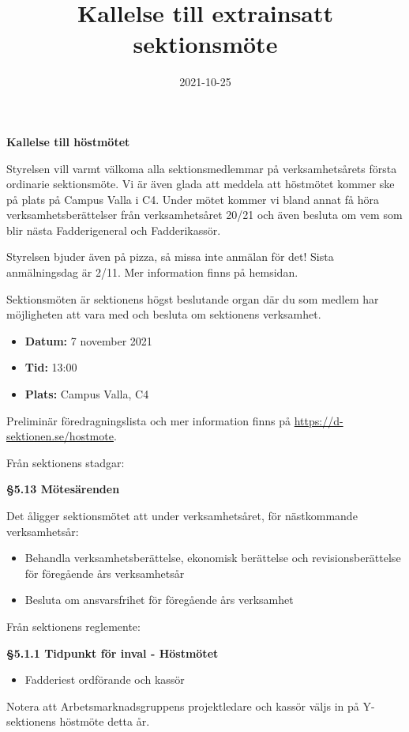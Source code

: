 \documentclass{datateknologsektionen-document}
\title{Kallelse till extrainsatt sektionsmöte}
\date{2021-10-25}
\begin{document}





\large
\begin{center}
  \vspace*{5mm}
  {\LARGE\bfseries Kallelse till höstmötet}
  \vspace{2mm}
\end{center}

Styrelsen vill varmt välkoma alla sektionsmedlemmar på verksamhetsårets första ordinarie sektionsmöte. Vi är även glada att meddela att höstmötet kommer ske på plats på Campus Valla i C4. Under mötet kommer vi bland annat få höra verksamhetsberättelser från verksamhetsåret 20/21 och även besluta om vem som blir nästa Fadderigeneral och Fadderikassör. 

Styrelsen bjuder även på pizza, så missa inte anmälan för det! Sista anmälningsdag är 2/11. Mer information finns på hemsidan.

Sektionsmöten är sektionens högst beslutande organ där du som medlem har möjligheten att vara med och besluta om sektionens verksamhet. 

\vspace*{4mm}
\begin{itemize}
  \item \textbf{Datum:} 7 november 2021
  \item \textbf{Tid:} 13:00
  \item \textbf{Plats:} Campus Valla, C4
  \vspace*{4mm}
\end{itemize}

Preliminär föredragningslista och mer information finns på \url{https://d-sektionen.se/hostmote}.


Från sektionens stadgar:

\textbf{§5.13 Mötesärenden}

Det åligger sektionsmötet att under verksamhetsåret, för nästkommande verksamhetsår:
\begin{itemize}
  \item Behandla verksamhetsberättelse, ekonomisk berättelse och revisionsberättelse för föregående års verksamhetsår
  \item Besluta om ansvarsfrihet för föregående års verksamhet
\end{itemize}

Från sektionens reglemente:

\textbf{§5.1.1 Tidpunkt för inval - Höstmötet}
\begin{itemize}
  \item Fadderiest ordförande och kassör
\end{itemize}
Notera att Arbetsmarknadsgruppens projektledare och kassör väljs in på Y-sektionens höstmöte detta år.
\end{document}
